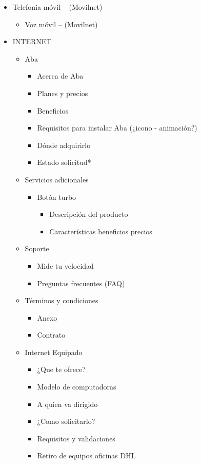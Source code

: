 \documentclass[11pt, letterpaper, oneside, spanish]{scrbook}
\begin{document}
\begin{itemize}
\begin{itemize}
\begin{itemize}
\end{itemize}
\item Telefonia móvil – (Movilnet)
\begin{itemize}
\item Voz móvil – (Movilnet)
\end{itemize}
\item INTERNET
\begin{itemize}
\item Aba
\begin{itemize}
\item Acerca de Aba
\item Planes y precios
\item Beneficios
\item Requisitos para instalar Aba (¿icono - animación?)
\item Dónde adquirirlo
\item Estado solicitud*
\end{itemize}
\item Servicios adicionales
\begin{itemize}
\item Botón turbo
\begin{itemize}
\item Descripción del producto
\item Características beneficios precios
\end{itemize}
\end{itemize}
\item Soporte
\begin{itemize}
\item Mide tu velocidad
\item Preguntas frecuentes (FAQ)
\end{itemize}
\item Términos y condiciones
\begin{itemize}
\item Anexo
\item Contrato
\end{itemize}
\item Internet Equipado
\begin{itemize}
\item ¿Que te ofrece?
\item Modelo de computadoras
\item A quien va dirigido
\item ¿Como solicitarlo?
\item Requisitos y validaciones
\item Retiro de equipos oficinas DHL
\end{itemize}

\end{itemize}
\end{itemize}
\end{itemize}
\end{document}
